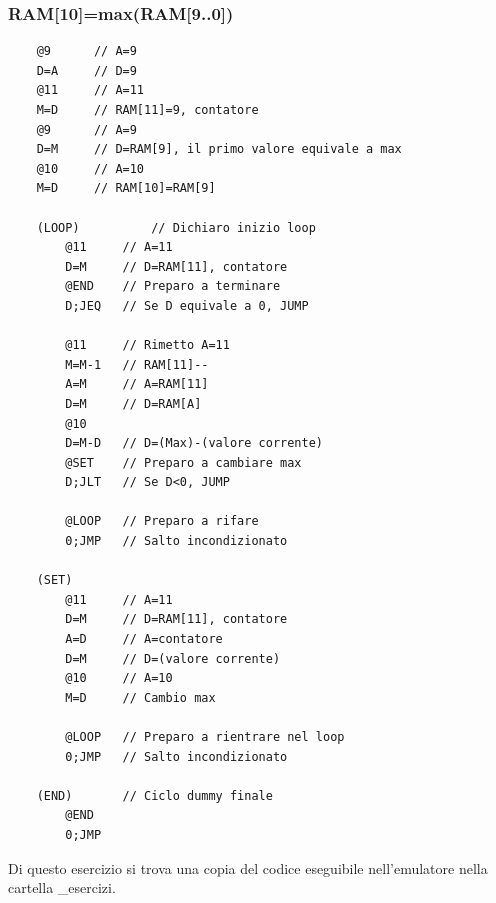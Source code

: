 \documentclass[12pt]{article}
\begin{document}
\subsubsection{RAM[10]=max(RAM[9..0])}
\begin{lstlisting}
    @9      // A=9
    D=A     // D=9
    @11     // A=11
    M=D     // RAM[11]=9, contatore
    @9      // A=9
    D=M     // D=RAM[9], il primo valore equivale a max
    @10     // A=10
    M=D     // RAM[10]=RAM[9]
        
    (LOOP)          // Dichiaro inizio loop
        @11     // A=11
        D=M     // D=RAM[11], contatore
        @END    // Preparo a terminare
        D;JEQ   // Se D equivale a 0, JUMP

        @11     // Rimetto A=11
        M=M-1   // RAM[11]--
        A=M     // A=RAM[11]
        D=M     // D=RAM[A]
        @10
        D=M-D   // D=(Max)-(valore corrente)
        @SET    // Preparo a cambiare max
        D;JLT   // Se D<0, JUMP

        @LOOP   // Preparo a rifare
        0;JMP   // Salto incondizionato   

    (SET)
        @11     // A=11
        D=M     // D=RAM[11], contatore
        A=D     // A=contatore
        D=M     // D=(valore corrente)
        @10     // A=10
        M=D     // Cambio max
        
        @LOOP   // Preparo a rientrare nel loop
        0;JMP   // Salto incondizionato

    (END)       // Ciclo dummy finale
        @END
        0;JMP
\end{lstlisting}
Di questo esercizio si trova una copia del codice eseguibile nell'emulatore nella cartella \_esercizi.
\end{document}
